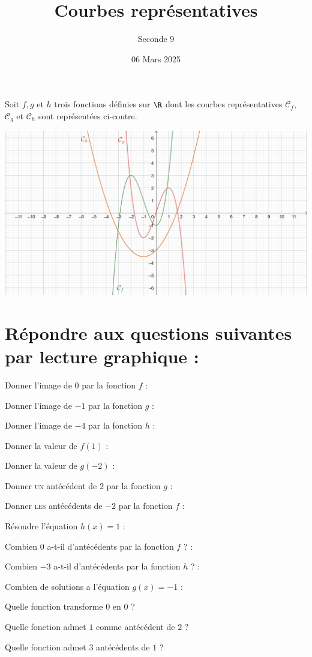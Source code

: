 \documentclass{article}
\title{Courbes représentatives}
\author{Seconde 9}
\date{06 Mars 2025}
\begin{document}
\maketitle

Soit $f, g$ et $h$ trois fonctions définies sur $\R$ dont les courbes représentatives $\mathcal{C}_f$, $\mathcal{C}_g$ et $\mathcal{C}_h$ sont représentées ci-contre.
\begin{center}
\includegraphics[width=\textwidth]{Courbes.png}
\end{center}
\section{Répondre aux questions suivantes par lecture graphique :}
\begin{enumquestions}
\item Donner l'image de $0$ par la fonction $f$ : \answersline
\item Donner l'image de $-1$ par la fonction $g$ : \answersline
\item Donner l'image de $-4$ par la fonction $h$ : \answersline
\item Donner la valeur de $f(1)$ : \answersline
\item Donner la valeur de $g(-2)$ : \answersline
\item Donner \textsc{un} antécédent de $2$ par la fonction $g$ : \answersline
\item Donner \textsc{les} antécédents de $-2$ par la fonction $f$ : \answersline
\item Résoudre l'équation $h(x) = 1$ : \answersline
\item Combien $0$ a-t-il d'antécédents par la fonction $f$ ? : \answersline
\item Combien $-3$ a-t-il d'antécédents par la fonction $h$ ? : \answersline
\item Combien de solutions a l'équation $g(x)=-1$ : \answersline
\item Quelle fonction transforme $0$ en $0$ ? \answersline
\item Quelle fonction admet $1$ comme antécédent de $2$ ? \answersline
\item Quelle fonction admet $3$ antécédents de $1$ ? \answersline
\end{enumquestions}
\end{document}
